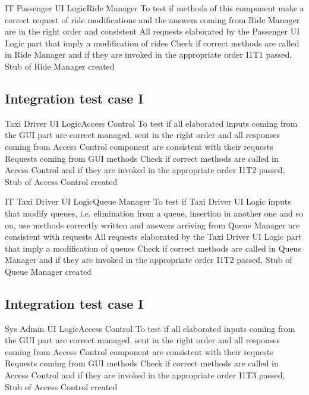 \vspace{2ex}
\tctable
{IT}
{Passenger UI Logic\textrightarrow Ride Manager}
{To test if methods of this component make a correct request of ride modifications and the answers coming from Ride Manager are in the right order and consistent}
{All requests elaborated by the Passenger UI Logic part that imply a modification of rides}
{Check if correct methods are called in Ride Manager and if they are invoked in the appropriate order}
{I1T1 passed, Stub of Ride Manager created}


\subsection{Integration test case I}
\setcounter{testcounter}{1}
{Taxi Driver UI Logic\textrightarrow Access Control}
{To test if all elaborated inputs coming from the GUI part are correct managed, sent in the right order and all responses coming from Access Control component are consistent with their requests}
{Requests coming from GUI methods}
{Check if correct methods are called in Access Control and if they are invoked in the appropriate order}
{I1T2 passed, Stub of Access Control created}

\vspace{2ex}
\tctable
{IT}
{Taxi Driver UI Logic\textrightarrow Queue Manager}
{To test if Taxi Driver UI Logic inputs that modify queues, i.e. elimination from a queue, insertion in another one and so on, use methods correctly written and answers arriving from Queue Manager are consistent with requests}
{All requests elaborated by the Taxi Driver UI Logic part that imply a modification of queues}
{Check if correct methods are called in Queue Manager and if they are invoked in the appropriate order}
{I1T2 passed, Stub of Queue Manager created}


\subsection{Integration test case I}
\setcounter{testcounter}{1}
{Sys Admin UI Logic\textrightarrow Access Control}
{To test if all elaborated inputs coming from the GUI part are correct managed, sent in the right order and all responses coming from Access Control component are consistent with their requests}
{Requests coming from GUI methods}
{Check if correct methods are called in Access Control and if they are invoked in the appropriate order}
{I1T3 passed, Stub of Access Control created}

